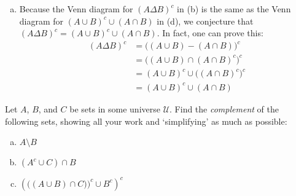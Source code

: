 \documentclass[11pt,letterpaper]{article}
\begin{document}
\begin{enumerate}[(a)]
\item Because the Venn diagram for $(A \Delta B)^c$ in (b) is the same as the Venn diagram for $(A \cup B)^c \cup (A \cap B)$ in (d), we conjecture that $(A \Delta B)^c= (A \cup B)^c \cup (A \cap B)$. In fact, one can prove this:
	\[
	\begin{aligned}
	(A \Delta B)^c&= \big( (A \cup B) - (A \cap B) \big)^c \\[0.3cm]
	&= \big( (A \cup B) \cap (A \cap B)^c \big)^c \\[0.3cm]
	&= (A \cup B)^c \cup \big( (A \cap B)^c \big)^c \\[0.3cm]
	&= (A \cup B)^c \cup (A \cap B)
	\end{aligned}
	\]
\end{enumerate}



\newpage



 Let $A$, $B$, and $C$ be sets in some universe $\mathcal{U}$. Find the \textit{complement} of the following sets, showing all your work and `simplifying' as much as possible:
	\begin{enumerate}[(a)]
	\item $A \setminus B$
	\item $(A^c \cup C) \cap B$
	\item $\left( \big( (A \cup B) \cap C) \big)^c \cup B^c \right)^c$
	\end{enumerate} \pspace
\end{document}
